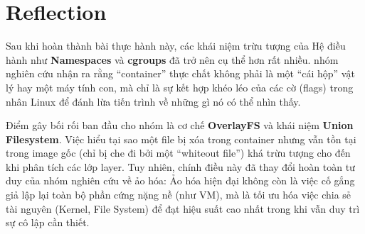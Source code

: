 \newpage
\section{Reflection}
Sau khi hoàn thành bài thực hành này, các khái niệm trừu tượng của Hệ điều hành như \textbf{Namespaces} và \textbf{cgroups} đã trở nên cụ thể hơn rất nhiều. nhóm nghiên cứu nhận ra rằng ``container'' thực chất không phải là một ``cái hộp'' vật lý hay một máy tính con, mà chỉ là sự kết hợp khéo léo của các cờ (flags) trong nhân Linux để đánh lừa tiến trình về những gì nó có thể nhìn thấy.

Điểm gây bối rối ban đầu cho nhóm là cơ chế \textbf{OverlayFS} và khái niệm \textbf{Union Filesystem}. Việc hiểu tại sao một file bị xóa trong container nhưng vẫn tồn tại trong image gốc (chỉ bị che đi bởi một ``whiteout file'') khá trừu tượng cho đến khi phân tích các lớp layer. Tuy nhiên, chính điều này đã thay đổi hoàn toàn tư duy của nhóm nghiên cứu về ảo hóa: Ảo hóa hiện đại không còn là việc cố gắng giả lập lại toàn bộ phần cứng nặng nề (như VM), mà là tối ưu hóa việc chia sẻ tài nguyên (Kernel, File System) để đạt hiệu suất cao nhất trong khi vẫn duy trì sự cô lập cần thiết.
